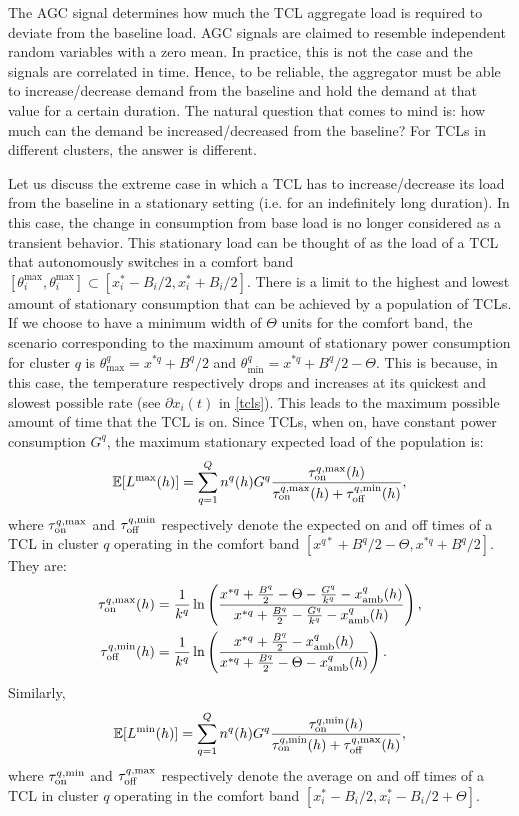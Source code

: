 \documentclass[10pt]{IEEEtran}
\begin{document}
The AGC signal determines how much the TCL aggregate load is required to deviate from the baseline load. 
AGC signals  are claimed to resemble independent random variables with a zero mean. In practice, this is not the case and the signals are correlated in time. Hence, to be reliable, the aggregator must be able to increase/decrease demand from the baseline and hold the demand at that value for a certain duration.
The natural question that comes to mind is: how much can the demand be increased/decreased from the baseline? For TCLs in different clusters, the answer is different. 

Let us discuss the extreme case in which a TCL has to increase/decrease its load from the baseline in a stationary setting (i.e. for an indefinitely long duration). In this case, the change in consumption from base load is no longer considered as a transient behavior. This stationary load can be thought of as the load of a TCL that autonomously switches   in a comfort band $[\theta^{\max}_i,\theta^{\max}_i] \subset [x^*_i-B_i/2,x_i^*+B_i/2]$.
There is a limit to the highest and lowest amount of stationary consumption that can be achieved by a population of TCLs. If we choose to have a minimum width of $\Theta$ units for the comfort band, the scenario corresponding to the maximum amount of stationary power consumption for cluster $q$ is $\theta_{\max}^q = x^{*q}+B^q/2$ and $\theta_{\min}^q= x^{*q}+B^q/2 - \Theta$. This is because, in this case, the temperature respectively drops and increases at its quickest and slowest possible rate (see $\partial x_i(t) $  in \eqref{tcls}). This leads to the maximum possible amount of time that the TCL is on. Since TCLs,  when on, have constant power consumption $G^q$, the maximum stationary expected load of the population is:
\begin{eqnarray}
{\mathbb E}[L^{\rm max}(h)] = \sum_{q=1}^Q n^q(h) G^q\frac{ \tau_{\rm on}^{q,\max}(h)}{\tau_{\rm on}^{q,\max}(h) + \tau_{\rm off}^{q,\min}(h)},\end{eqnarray}
where
 $\tau_{\rm on}^{q,\max}$ and $\tau_{\rm off}^{q,\min}$ respectively denote the expected on and off times of a TCL in cluster $q$  operating in the comfort band $[x^{q*}+B^q/2 - \Theta, x^{*q}+B^q/2]$. They are:
 \begin{align}
 \tau_{\rm on}^{q,\max}(h)&=\frac{1}{k^q} \ln\left(
\frac{x^{*q}+\frac{B^q} 2 - \Theta-\frac{G^q}{k^q}-x_{\rm amb}^q(h)}
{x^{*q}+\frac{B^q} 2-\frac{G^q}{k^q}-x_{\rm amb}^q(h)}
\right),\\
 \tau_{\rm off}^{q,\min}(h)&=\frac{1}{k^q} \ln\left(
\frac{x^{*q}+\frac{B^q} 2 -x_{\rm amb}^q(h)}
{x^{*q}+\frac{B^q} 2 - \Theta-x_{\rm amb}^q(h)}
\right).
 \end{align} 
Similarly, \begin{eqnarray}
{\mathbb E}[L^{\rm min}(h)] = \sum_{q=1}^Q n^q(h) G^q\frac{ \tau_{\rm on}^{q,\min}(h)}{\tau_{\rm on}^{q,\min}(h) + \tau_{\rm off}^{q,\max}(h)},
\end{eqnarray}
where $\tau_{\rm on}^{q,\min}$ and $\tau_{\rm off}^{q,\max}$ respectively denote the average on and off times of a TCL in cluster $q$  operating in the comfort band $[x_i^*-B_i/2, x_i^*-B_i/2+\Theta]$. 
\end{document}
